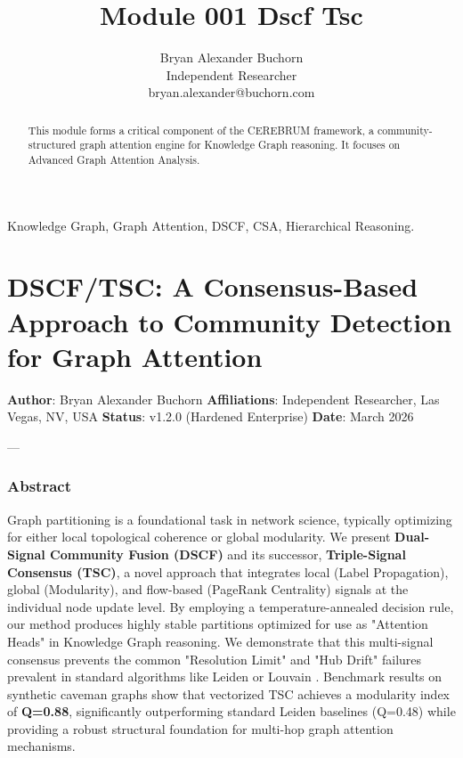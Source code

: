\documentclass[10pt,journal,compsoc]{IEEEtran}
\begin{document}
\title{Module 001 Dscf Tsc}
\author{Bryan Alexander Buchorn \\ Independent Researcher \\ bryan.alexander@buchorn.com}

\maketitle

\begin{abstract}
This module forms a critical component of the CEREBRUM framework, a community-structured graph attention engine for Knowledge Graph reasoning. It focuses on Advanced Graph Attention Analysis.
\end{abstract}

\begin{IEEEkeywords}
Knowledge Graph, Graph Attention, DSCF, CSA, Hierarchical Reasoning.
\end{IEEEkeywords}

\section{DSCF/TSC: A Consensus-Based Approach to Community Detection for Graph Attention}

\textbf{Author}: Bryan Alexander Buchorn  
\textbf{Affili\-ations}: Independent Researcher, Las Vegas, NV, USA  
\textbf{Status}: v1.2.0 (Hardened Enterprise)  
\textbf{Date}: March 2026

---

\subsubsection{Abstract}
Graph parti\-tioning is a found\-ational task in network science, typically optimizing for either local topological coherence or global modularity. We present \textbf{Dual-Signal Community Fusion (DSCF)} and its successor, \textbf{Triple-Signal Consensus (TSC)}, a novel approach that integrates local (Label Propagation), global (Modularity), and flow-based (PageRank Centrality) signals at the individual node update level. By employing a temperature-annealed decision rule, our method produces highly stable partitions optimized for use as "Attention Heads" in Knowledge Graph reasoning. We demonstrate that this multi-signal consensus prevents the common "Resolution Limit" and "Hub Drift" failures prevalent in standard algorithms like Leiden \cite{traag2019louvain} or Louvain \cite{blondel2008louvain}. Benchmark results on synthetic caveman graphs show that vectorized TSC achieves a modularity index of \textbf{Q=0.88}, signi\-ficantly outpe\-rforming standard Leiden baselines (Q=0.48) while providing a robust structural foundation for multi-hop graph attention mechanisms.
\end{document}
